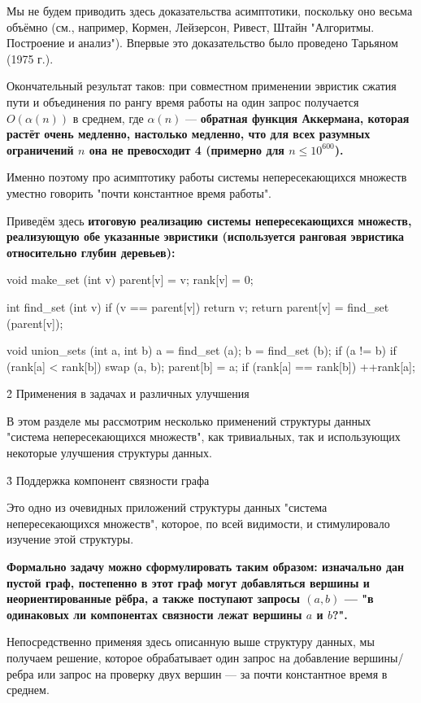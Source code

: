 Мы не будем приводить здесь доказательства асимптотики, поскольку оно весьма объёмно (см., например, Кормен, Лейзерсон, Ривест, Штайн "Алгоритмы. Построение и анализ"). Впервые это доказательство было проведено Тарьяном (1975 г.).

Окончательный результат таков: при совместном применении эвристик сжатия пути и объединения по рангу время работы на один запрос получается $O (\alpha(n))$ в среднем, где $\alpha(n)$ --- \bf{обратная функция Аккермана}, которая растёт очень медленно, настолько медленно, что для всех разумных ограничений $n$ она \bf{не превосходит 4} (примерно для $n \le 10^{600}$).

Именно поэтому про асимптотику работы системы непересекающихся множеств уместно говорить "почти константное время работы".

Приведём здесь \bf{итоговую реализацию системы непересекающихся множеств}, реализующую обе указанные эвристики (используется ранговая эвристика относительно глубин деревьев):

\code
void make_set (int v) {
	parent[v] = v;
	rank[v] = 0;
}

int find_set (int v) {
	if (v == parent[v])
		return v;
	return parent[v] = find_set (parent[v]);
}

void union_sets (int a, int b) {
	a = find_set (a);
	b = find_set (b);
	if (a != b) {
		if (rank[a] < rank[b])
			swap (a, b);
		parent[b] = a;
		if (rank[a] == rank[b])
			++rank[a];
	}
}
\endcode




\h2{ Применения в задачах и различных улучшения }

В этом разделе мы рассмотрим несколько применений структуры данных "система непересекающихся множеств", как тривиальных, так и использующих некоторые улучшения структуры данных.



\h3{ Поддержка компонент связности графа }

Это одно из очевидных приложений структуры данных "система непересекающихся множеств", которое, по всей видимости, и стимулировало изучение этой структуры.

\bf{Формально} задачу можно сформулировать таким образом: изначально дан пустой граф, постепенно в этот граф могут добавляться вершины и неориентированные рёбра, а также поступают запросы $(a,b)$ --- "в одинаковых ли компонентах связности лежат вершины $a$ и $b$?".

Непосредственно применяя здесь описанную выше структуру данных, мы получаем решение, которое обрабатывает один запрос на добавление вершины/ребра или запрос на проверку двух вершин --- за почти константное время в среднем.

